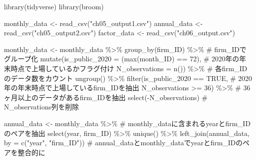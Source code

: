 \documentclass[
  letterpaper,
  DIV=11,
  numbers=noendperiod]{scrreprt}
\newenvironment{Shaded}{\begin{snugshade}}{\end{snugshade}}
\newcommand{\AttributeTok}[1]{\textcolor[rgb]{0.40,0.45,0.13}{#1}}
\newcommand{\CommentTok}[1]{\textcolor[rgb]{0.37,0.37,0.37}{#1}}
\newcommand{\ConstantTok}[1]{\textcolor[rgb]{0.56,0.35,0.01}{#1}}
\newcommand{\DecValTok}[1]{\textcolor[rgb]{0.68,0.00,0.00}{#1}}
\newcommand{\FunctionTok}[1]{\textcolor[rgb]{0.28,0.35,0.67}{#1}}
\newcommand{\NormalTok}[1]{\textcolor[rgb]{0.00,0.23,0.31}{#1}}
\newcommand{\OtherTok}[1]{\textcolor[rgb]{0.00,0.23,0.31}{#1}}
\newcommand{\SpecialCharTok}[1]{\textcolor[rgb]{0.37,0.37,0.37}{#1}}
\newcommand{\StringTok}[1]{\textcolor[rgb]{0.13,0.47,0.30}{#1}}
\begin{document}
\begin{Shaded}
\begin{Highlighting}[]
\FunctionTok{library}\NormalTok{(tidyverse)}
\FunctionTok{library}\NormalTok{(broom)}

\NormalTok{monthly\_data }\OtherTok{\textless{}{-}} \FunctionTok{read\_csv}\NormalTok{(}\StringTok{"ch05\_output1.csv"}\NormalTok{)}
\NormalTok{annual\_data  }\OtherTok{\textless{}{-}} \FunctionTok{read\_csv}\NormalTok{(}\StringTok{"ch05\_output2.csv"}\NormalTok{)}
\NormalTok{factor\_data }\OtherTok{\textless{}{-}} \FunctionTok{read\_csv}\NormalTok{(}\StringTok{"ch06\_output.csv"}\NormalTok{)}

\NormalTok{monthly\_data }\OtherTok{\textless{}{-}}\NormalTok{ monthly\_data }\SpecialCharTok{\%\textgreater{}\%} 
  \FunctionTok{group\_by}\NormalTok{(firm\_ID) }\SpecialCharTok{\%\textgreater{}\%} \CommentTok{\# firm\_IDでグループ化}
  \FunctionTok{mutate}\NormalTok{(}\AttributeTok{is\_public\_2020 =}\NormalTok{ (}\FunctionTok{max}\NormalTok{(month\_ID) }\SpecialCharTok{==} \DecValTok{72}\NormalTok{), }\CommentTok{\# 2020年の年末時点で上場しているかフラグ付け}
         \AttributeTok{N\_observations =} \FunctionTok{n}\NormalTok{()) }\SpecialCharTok{\%\textgreater{}\%} \CommentTok{\# 各firm\_IDのデータ数をカウント}
  \FunctionTok{ungroup}\NormalTok{() }\SpecialCharTok{\%\textgreater{}\%} 
  \FunctionTok{filter}\NormalTok{(is\_public\_2020 }\SpecialCharTok{==} \ConstantTok{TRUE}\NormalTok{, }\CommentTok{\# 2020年の年末時点で上場しているfirm\_IDを抽出}
\NormalTok{         N\_observations }\SpecialCharTok{\textgreater{}=} \DecValTok{36}\NormalTok{) }\SpecialCharTok{\%\textgreater{}\%} \CommentTok{\# 36ヶ月以上のデータがあるfirm\_IDを抽出}
  \FunctionTok{select}\NormalTok{(}\SpecialCharTok{{-}}\NormalTok{N\_observations) }\CommentTok{\# N\_observations列を削除}

\NormalTok{annual\_data }\OtherTok{\textless{}{-}}\NormalTok{ monthly\_data }\SpecialCharTok{\%\textgreater{}\%} \CommentTok{\# monthly\_dataに含まれるyearとfirm\_IDのペアを抽出}
  \FunctionTok{select}\NormalTok{(year, firm\_ID) }\SpecialCharTok{\%\textgreater{}\%} 
  \FunctionTok{unique}\NormalTok{() }\SpecialCharTok{\%\textgreater{}\%}
  \FunctionTok{left\_join}\NormalTok{(annual\_data, }\AttributeTok{by =} \FunctionTok{c}\NormalTok{(}\StringTok{"year"}\NormalTok{, }\StringTok{"firm\_ID"}\NormalTok{)) }\CommentTok{\# annual\_dataとmonthly\_dataでyearとfirm\_IDのペアを整合的に}
\end{Highlighting}
\end{Shaded}
\end{document}

